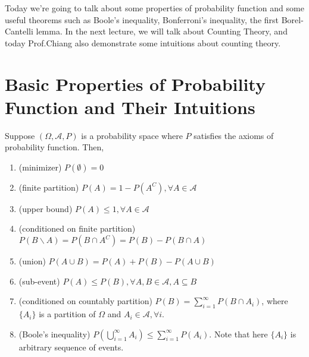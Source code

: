 \documentclass[Probability Theory.tex]{subfiles}
\begin{document}
Today we're going to talk about some properties of probability function and some useful theorems such as Boole's inequality, Bonferroni's inequality, the first Borel-Cantelli lemma. In the next lecture, we will talk about Counting Theory, and today Prof.Chiang also demonstrate some intuitions about counting theory.

\section{Basic Properties of Probability Function and Their Intuitions}
\begin{theorem}
	Suppose $(\Omega,\mathcal{A},P)$ is a probability space where $P$ satisfies the axioms of probability function. Then,
	\begin{enumerate}
		\item (minimizer) $P(\emptyset) = 0$
		\item (finite partition) $P(A) = 1-P(A^C), \forall A\in\mathcal{A}$
		\item (upper bound) $P(A)\leq1, \forall A\in\mathcal{A}$
		\item (conditioned on finite partition) $P(B\backslash A) = P(B\cap A^C) = P(B) - P(B\cap A)$
		\item (union) $P(A\cup B) = P(A) + P(B) - P(A\cup B)$
		\item (sub-event) $P(A)\leq P(B),\forall A,B\in\mathcal{A},A\subseteq B$
		\item (conditioned on countably partition) $P(B) = \sum_{i=1}^{\infty} P(B\cap A_i)$, where $\{A_i\}$ is a partition of $\Omega$ and $A_i\in\mathcal{A},\forall i$.
		\item (Boole's inequality) $P(\bigcup_{i=1}^{\infty}A_i)\leq\sum_{i=1}^{\infty}P(A_i)$. Note that here $\{A_i\}$ is arbitrary sequence of events.
	\end{enumerate}
\end{theorem}
\end{document}
